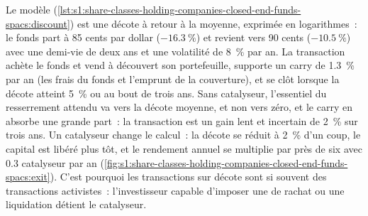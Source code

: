 Le modèle (\cref{lst:s1:share-classes-holding-companies-closed-end-funds-spacs:discount}) est une décote à retour à la moyenne, exprimée en logarithmes~: le fonds part à 85 cents
par dollar ($-16.3~\%$) et revient vers 90 cents ($-10.5~\%$) avec une demi-vie de deux ans et une volatilité de 8~\% par an. La transaction achète le fonds et vend
à découvert son portefeuille, supporte un carry de 1.3~\% par an (les frais du fonds et l'emprunt de la couverture), et se clôt lorsque la décote atteint 5~\% ou au bout de trois ans.
Sans catalyseur, l'essentiel du resserrement attendu va vers la décote moyenne, et non vers zéro, et le carry en absorbe une grande part~: la transaction est un gain lent et incertain de
2~\% sur trois ans. Un catalyseur change le calcul~: la décote se réduit à 2~\% d'un coup, le capital est libéré plus tôt, et le rendement annuel
se multiplie par près de six avec 0.3 catalyseur par an (\cref{fig:s1:share-classes-holding-companies-closed-end-funds-spacs:exit}). C'est pourquoi les transactions sur décote sont si souvent
des transactions activistes~: l'investisseur capable d'imposer une  de rachat ou une liquidation détient le catalyseur.

\begin{omfigure}

\label{fig:s1:share-classes-holding-companies-closed-end-funds-spacs:exit}
\end{omfigure}

